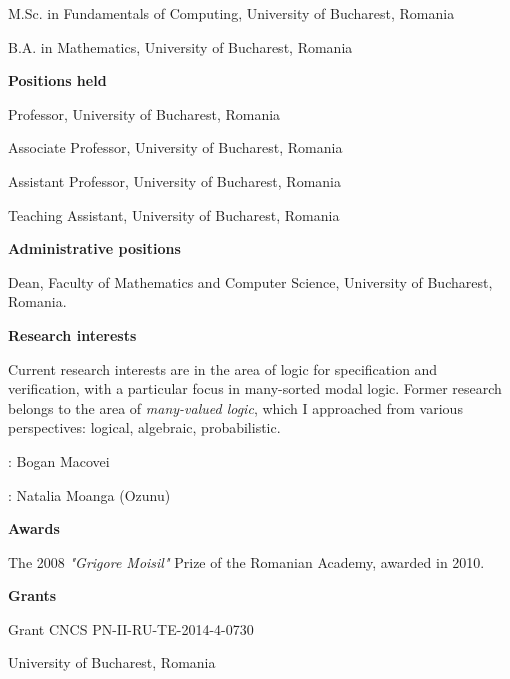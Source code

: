 \documentclass[11pt]{article}
\begin{document}
\noindent
[1996] M.Sc. in Fundamentals of Computing, University of Bucharest, Romania

\noindent
[1995] B.A. in Mathematics, University of Bucharest, Romania

\vspace{.2cm}
\noindent
\textbf{Positions held}

 Professor,  University of Bucharest, Romania

 Associate Professor, University of Bucharest, Romania

\noindent
[1999 - September 2012] Assistant Professor, University of Bucharest, Romania

\noindent
[1996 - 1999] Teaching Assistant, University of Bucharest, Romania


\vspace{.2cm}
\noindent
\textbf{Administrative positions}

 Dean, Faculty of Mathematics and Computer Science,  University of Bucharest, Romania.

\vspace{.2cm}
\noindent
\textbf{Research  interests}

\noindent Current research interests are in the area of logic for specification and  verification, with a particular focus in many-sorted modal logic.   Former research belongs to the area of  {\em many-valued logic}, which I approached from various perspectives: logical, algebraic, probabilistic. 

: Bogan Macovei 

: Natalia Moanga (Ozunu)


\vspace{.2cm}
\noindent
{\large \textbf{Awards}}

\noindent The 2008 {\em"Grigore Moisil"} Prize of the Romanian
Academy, awarded in 2010.


\vspace{.2cm}
\noindent
{\large \textbf{Grants}} 

 Grant CNCS PN-II-RU-TE-2014-4-0730
 
University of Bucharest, Romania
\end{document}
